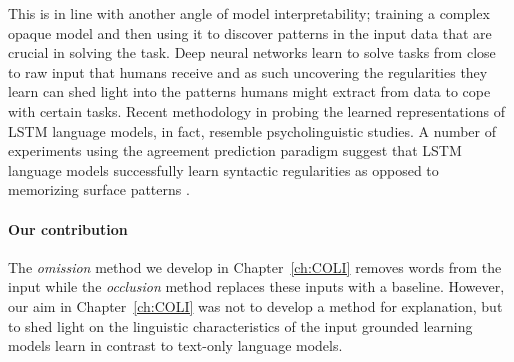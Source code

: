 This is in line with another angle of model interpretability;
training a complex opaque model and then using it to discover patterns in the
input data that are crucial in solving the task.
Deep neural networks learn to solve tasks from close to raw input that humans receive and as such
uncovering the regularities they learn can shed light into the patterns humans might extract
from data to cope with certain tasks.
Recent methodology in probing the learned representations of LSTM language models, in fact, resemble psycholinguistic studies.
A number of experiments using the agreement prediction paradigm \cite{bock1991broken} suggest that
LSTM language models successfully learn syntactic regularities as opposed to memorizing surface patterns
\cite{linzen2016assessing,enguehard2017exploring,bernardy2017using,gulordava2018colorless}.

\paragraph{Our contribution}
The \emph{omission} method we develop in Chapter~\ref{ch:COLI} removes words from the input while the \emph{occlusion} \cite{li2016understanding}
method replaces these inputs with a baseline.  However, our aim in Chapter~\ref{ch:COLI} was not to develop a method for explanation, but to
shed light on the linguistic characteristics of the input grounded learning models learn in contrast to text-only language models.





